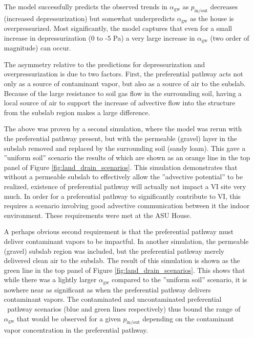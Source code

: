 \documentclass[preprint,12pt]{elsarticle}
\begin{document}
The model successfully predicts the observed trends in $\alpha_\mathrm{gw}$ as $p_\mathrm{in/out}$ decreases (increased depressurization) but somewhat underpredicts $\alpha_\mathrm{gw}$ as the house is overpressurized.
Most significantly, the model captures that even for a small increase in depressurization (0 to -5 Pa) a very large increase in $\alpha_\mathrm{gw}$ (two order of magnitude) can occur.\par

The asymmetry relative to the predictions for depressurization and overpressurization is due to two factors.
First, the preferential pathway acts not only as a source of contaminant vapor, but also  as a source of air to the subslab.
Because of the large resistance to soil gas flow in the surrounding soil, having a local source of air to support the increase of advective flow into the structure from the subslab region makes a large difference.\par

The above was proven by a second simulation, where the model was rerun with the preferential pathway present, but with the permeable (gravel) layer in the subslab removed and replaced by the surrounding soil (sandy loam).
This gave a ”uniform soil” scenario the results of which are shown as an orange line in the top panel of Figure \ref{fig:land_drain_scenarios}.
This simulation demonstrates that without a permeable subslab to effectively allow the ”advective potential” to be realized, existence of preferential pathway will actually not impact a VI site very much.
In order for a preferential pathway to significantly contribute to VI, this requires a scenario involving good advective communication between it the indoor environment.
These requirements were met at the ASU House.\par

A perhaps obvious second requirement is that the preferential pathway must deliver contaminant vapors to be impactful.
In another simulation, the permeable (gravel) subslab region was included, but the preferential pathway merely delivered clean air to the subslab.
The result of this simulation is shown as the green line in the top panel of Figure \ref{fig:land_drain_scenarios}.
This shows that while there was a lightly larger $\alpha_\mathrm{gw}$ compared to the ”uniform soil” scenario, it is nowhere near as significant as when the preferential pathway delivers contaminant vapors.
The contaminated and uncontaminated preferential  pathway scenarios (blue and green lines respectively) thus bound the range of $\alpha_\mathrm{gw}$ that would be observed for a given $p_\mathrm{in/out}$ depending on the contaminant vapor concentration in the preferential pathway.\par
\end{document}
